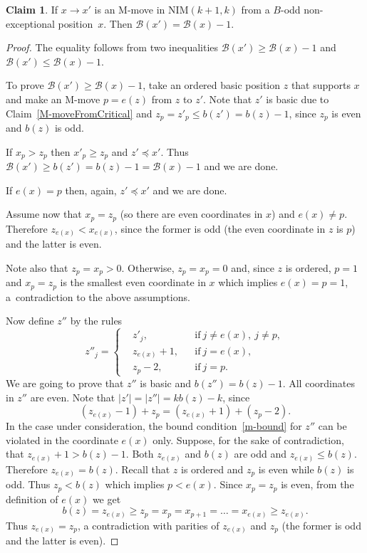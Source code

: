 \documentclass{article}
\theoremstyle{definition}
\newtheorem{claim}{Claim}
\def\B{\mathcal{B}}
\begin{document}
\begin{claim}\label{FromGodd}
   If $x\to x'$ is an M-move in \textup{NIM}$(k+1,k)$ from a $B$-odd non-exceptional position~$x$. Then $\B(x') = \B(x)-1$. 
\end{claim}
\begin{proof}
  The equality follows from two inequalities $\B(x') \geq \B(x)-1$ and $\B(x') \leq \B(x)-1$.

\smallskip
  
  To prove $\B(x') \geq \B(x)-1$, take an ordered basic position $z$ that supports $x$ and make an M-move $p = e(z)$ from $z$ to $z'$. Note that $z'$ is basic due to Claim~\ref{M-moveFromCritical} and $z_p=z'_{p}\leq b(z') = b(z) -1$, since $z_p$ is even and $b(z)$ is odd.

  If   $x_p>z_p$ then $x'_p\geq z_p$ and $z'\preceq x'$. Thus $\B(x')\geq b(z') = b(z)-1 = \B(x)-1$ and we are done.

If  $e(x)=p$ then, again,  $z'\preceq x'$ and we are done.
  
Assume now that $x_p=z_p$ (so there are even coordinates in $x$) and $e(x)\ne p$. Therefore $z_{e(x)}< x_{e(x)}$, since the former is odd (the even coordinate in $z$ is $p$) and the latter is even.

Note also that $z_p=x_p>0$. Otherwise, $z_p=x_p=0$ and, since $z$ is ordered,   $p=1$ and  $x_p=z_p$ is the smallest even coordinate in $x$ which implies $e(x) = p =1$, a~contradiction to the above assumptions.

Now  define $z''$ by the rules
\[
z''_j = \left\{
\begin{aligned}
  &z'_j, &&\text{if}\ j\ne e(x), \ j\ne p,\\
  &z_{e(x)}+1, &&\text{if}\ j= e(x),\\
  &z_p-2, &&\text{if}\ j= p.
\end{aligned}\right.
\]
We are going to prove that $z''$ is basic and $b(z'') = b(z)-1$.
All coordinates in $z''$ are even. Note that $|z'|=|z''|= kb(z)-k $, since \[(z_{e(x)}-1) + z_p = (z_{e(x)}+1)+(z_p-2).\] In the case under consideration, the bound condition~\eqref{m-bound} for $z''$ can be violated in the coordinate $e(x)$ only. Suppose, for the sake of contradiction, that $z_{e(x)}+1> b(z)-1$. Both $z_{e(x)}$ and $b(z)$ are odd and $z_{e(x)}\leq b(z)$. Therefore $z_{e(x)}=b(z)$.
Recall that  $z$ is ordered and $z_{p}$ is even while $b(z)$ is odd. Thus $z_{p}< b(z)$ which implies $p< e(x)$. 
Since $x_p=z_p$ is even, from the definition of $e(x)$ we get
\[
b(z) = z_{e(x)} \geq z_p = x_p = x_{p+1} = \dots = x_{e(x)}\geq z_{e(x)}.
\]
Thus $z_{e(x)}= z_p$, a contradiction with parities of $z_{e(x)}$ and $z_p$ (the former is odd and the latter is even).


\end{proof}
\end{document}
